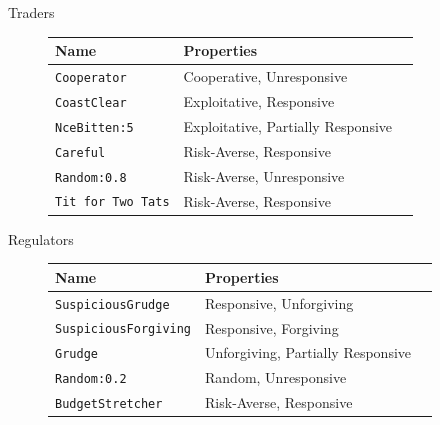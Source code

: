 \documentclass{beamer}
\begin{document}

\begin{frame}{Traders}
\begin{figure}
\centering
\begin{tabular}{l l l}
Name & Properties \\
\hline\hline
\texttt{Cooperator} & Cooperative, Unresponsive \\
\texttt{CoastClear} & Exploitative, Responsive \\
\texttt{NceBitten:5} & Exploitative, Partially Responsive \\
\texttt{Careful} & Risk-Averse, Responsive \\
\texttt{Random:0.8} & Risk-Averse, Unresponsive \\
\texttt{Tit for Two Tats} & Risk-Averse, Responsive \\
\end{tabular}
\end{figure}
\end{frame}

\begin{frame}{Regulators}
\begin{figure}
\centering
\begin{tabular}{l l l}
Name & Properties \\
\hline\hline
\texttt{SuspiciousGrudge} & Responsive, Unforgiving \\
\texttt{SuspiciousForgiving} & Responsive, Forgiving \\
\texttt{Grudge} & Unforgiving, Partially Responsive \\
\texttt{Random:0.2} & Random, Unresponsive \\
\texttt{BudgetStretcher} & Risk-Averse, Responsive \\
\end{tabular}
\end{figure}
\end{frame}
\end{document}

